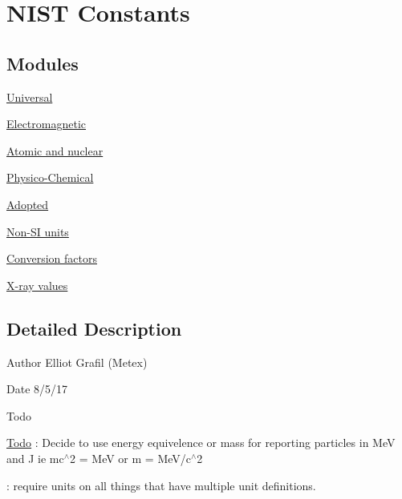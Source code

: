 \hypertarget{group___n_i_s_t_const}{}\section{N\+I\+ST Constants}
\label{group___n_i_s_t_const}
\subsection*{Modules}
\begin{DoxyCompactItemize}
\item 
\hyperlink{group___universal}{Universal}
\item 
\hyperlink{group___electromagnetic}{Electromagnetic}
\item 
\hyperlink{group___atomic}{Atomic and nuclear}
\item 
\hyperlink{group___physico_chemical}{Physico-\/\+Chemical}
\item 
\hyperlink{group___adopted}{Adopted}
\item 
\hyperlink{group___non-_s_i}{Non-\/\+S\+I units}
\item 
\hyperlink{group___conversion_factors}{Conversion factors}
\item 
\hyperlink{group___x-ray}{X-\/ray values}
\end{DoxyCompactItemize}


\subsection{Detailed Description}
\begin{DoxyAuthor}{Author}
Elliot Grafil (Metex) 
\end{DoxyAuthor}
\begin{DoxyDate}{Date}
8/5/17 
\end{DoxyDate}
\begin{DoxyRefDesc}{Todo}
\item[\hyperlink{todo__todo000001}{Todo}]\+: Decide to use energy equivelence or mass for reporting particles in MeV and J ie mc$^\wedge$2 = MeV or m = Me\+V/c$^\wedge$2 

\+: require units on all things that have multiple unit definitions. \end{DoxyRefDesc}
